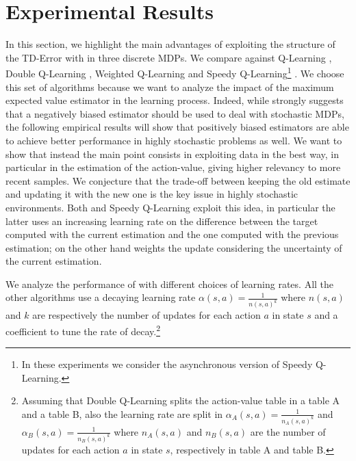 \documentclass[conference]{IEEEtran}
\begin{document}
\section{Experimental Results}\label{S:empirical}
In this section, we highlight the main advantages of exploiting the structure of the TD-Error with \alg in three discrete MDPs. We compare \alg against Q-Learning \cite{watkins1992q}, Double Q-Learning \cite{van2010double}, Weighted Q-Learning \cite{d2016estimating} and Speedy Q-Learning\footnote{In these experiments we consider the asynchronous version of Speedy Q-Learning.} \cite{NIPS2011_4251}. We choose this set of algorithms because we want to analyze the impact of the maximum expected value estimator in the learning process. Indeed, while \cite{van2010double} strongly suggests that a negatively biased estimator should be used to deal with stochastic MDPs, the following empirical results will show that positively biased estimators are able to achieve better performance in highly stochastic problems as well. We want to show that instead the main point consists in exploiting data in the best way, in particular in the estimation of the action-value, giving higher relevancy to more recent samples. We conjecture that the trade-off between keeping the old estimate and updating it with the new one is the key issue in highly stochastic environments. Both \alg and Speedy Q-Learning exploit this idea, in particular the latter uses an increasing learning rate on the difference between the target computed with the current estimation and the one computed with the previous estimation; on the other hand \alg weights the update considering the uncertainty of the current estimation.

We analyze the performance of \alg with different choices of learning rates. All the other algorithms use a decaying learning rate $\alpha(s, a) = \frac{1}{n(s, a)^{k}}$ where $n(s, a)$ and $k$ are respectively the number of updates for each action $a$ in state $s$ and a coefficient to tune the rate of decay.\footnote{Assuming that Double Q-Learning splits the action-value table in a table A and a table B, also the learning rate are split in $\alpha_A(s, a) = \frac{1}{n_A(s, a)^{k}}$ and $\alpha_B(s, a) = \frac{1}{n_B(s, a)^{k}}$ where $n_A(s, a)$ and $n_B(s, a)$ are the number of updates for each action $a$ in state $s$, respectively in table A and table B.}
\end{document}
